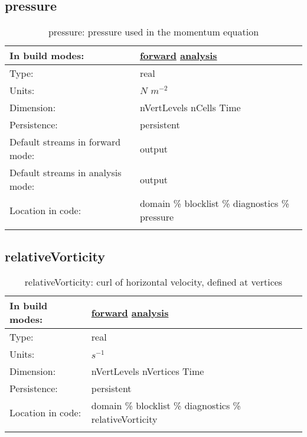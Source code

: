 \subsection[pressure]{pressure}
\label{subsec:var_sec_diagnostics_pressure}
\begin{center}
\begin{longtable}{| p{2.0in} | p{4.0in} |}
        \hline 
        In build modes: & \hyperref[subsec:forward_var_tab_diagnostics]{forward} \hyperref[subsec:analysis_var_tab_diagnostics]{analysis} \\
        \hline 
        Type: & real \\
        \hline 
        Units: & $N$ $m^{-2}$ \\
        \hline 
        Dimension: & nVertLevels nCells Time \\
        \hline 
        Persistence: & persistent \\
        \hline 
		 Default streams in forward mode: &  output \\
        \hline 
		 Default streams in analysis mode: &  output \\
        \hline 
		 Location in code: & domain \% blocklist \% diagnostics \% pressure \\
		 \hline 
    \caption{pressure: pressure used in the momentum equation}
\end{longtable}
\end{center}
\subsection[relativeVorticity]{relativeVorticity}
\label{subsec:var_sec_diagnostics_relativeVorticity}
\begin{center}
\begin{longtable}{| p{2.0in} | p{4.0in} |}
        \hline 
        In build modes: & \hyperref[subsec:forward_var_tab_diagnostics]{forward} \hyperref[subsec:analysis_var_tab_diagnostics]{analysis} \\
        \hline 
        Type: & real \\
        \hline 
        Units: & $s^{-1}$ \\
        \hline 
        Dimension: & nVertLevels nVertices Time \\
        \hline 
        Persistence: & persistent \\
        \hline 
		 Location in code: & domain \% blocklist \% diagnostics \% relativeVorticity \\
		 \hline 
    \caption{relativeVorticity: curl of horizontal velocity, defined at vertices}
\end{longtable}
\end{center}
